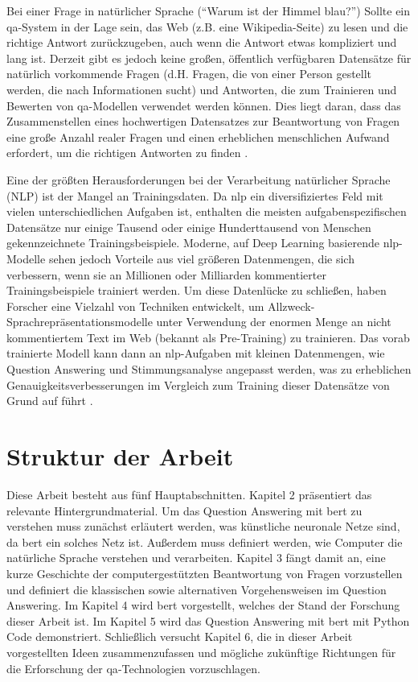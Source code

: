 \documentclass[
        ngerman,
        paper=a4,
        numbers=noendperiod,
]{scrreprt}
\begin{document}
Bei einer Frage in natürlicher Sprache (\enquote{Warum ist der Himmel blau?}) Sollte ein \ac{qa}-System in der Lage sein, das Web (z.B. eine Wikipedia-Seite) zu lesen und die richtige Antwort zurückzugeben, auch wenn die Antwort etwas kompliziert und lang ist. Derzeit gibt es jedoch keine großen, öffentlich verfügbaren Datensätze für natürlich vorkommende Fragen (d.H. Fragen, die von einer Person gestellt werden, die nach Informationen sucht) und Antworten, die zum Trainieren und Bewerten von \ac{qa}-Modellen verwendet werden können. Dies liegt daran, dass das Zusammenstellen eines hochwertigen Datensatzes zur Beantwortung von Fragen eine große Anzahl realer Fragen und einen erheblichen menschlichen Aufwand erfordert, um die richtigen Antworten zu finden \citep{GoogleResearch}.

Eine der größten Herausforderungen bei der Verarbeitung natürlicher Sprache (NLP) ist der Mangel an Trainingsdaten. Da \ac{nlp} ein diversifiziertes Feld mit vielen unterschiedlichen Aufgaben ist, enthalten die meisten aufgabenspezifischen Datensätze nur einige Tausend oder einige Hunderttausend von Menschen gekennzeichnete Trainingsbeispiele. Moderne, auf Deep Learning basierende \ac{nlp}-Modelle sehen jedoch Vorteile aus viel größeren Datenmengen, die sich verbessern, wenn sie an Millionen oder Milliarden kommentierter Trainingsbeispiele trainiert werden. Um diese Datenlücke zu schließen, haben Forscher eine Vielzahl von Techniken entwickelt, um Allzweck-Sprachrepräsentationsmodelle unter Verwendung der enormen Menge an nicht kommentiertem Text im Web (bekannt als Pre-Training) zu trainieren. Das vorab trainierte Modell kann dann an \ac{nlp}-Aufgaben mit kleinen Datenmengen, wie Question Answering und Stimmungsanalyse angepasst werden, was zu erheblichen Genauigkeitsverbesserungen im Vergleich zum Training dieser Datensätze von Grund auf führt \citep{GoogleProcessing}.
\section{Struktur der Arbeit}
Diese Arbeit besteht aus fünf Hauptabschnitten. Kapitel 2 präsentiert das relevante Hintergrundmaterial. Um das Question Answering mit \ac{bert} zu verstehen muss zunächst erläutert werden, was künstliche neuronale Netze sind, da \ac{bert} ein solches Netz ist. Außerdem muss definiert werden, wie Computer die natürliche Sprache verstehen und verarbeiten. Kapitel 3 fängt damit an, eine kurze Geschichte der computergestützten Beantwortung von Fragen vorzustellen und definiert die klassischen sowie alternativen Vorgehensweisen im Question Answering. Im Kapitel 4 wird \ac{bert} vorgestellt, welches der Stand der Forschung dieser Arbeit ist. Im Kapitel 5 wird das Question Answering mit \ac{bert} mit Python Code demonstriert. Schließlich versucht Kapitel 6, die in dieser Arbeit vorgestellten Ideen zusammenzufassen und mögliche zukünftige Richtungen für die Erforschung der \ac{qa}-Technologien vorzuschlagen.
\end{document}
